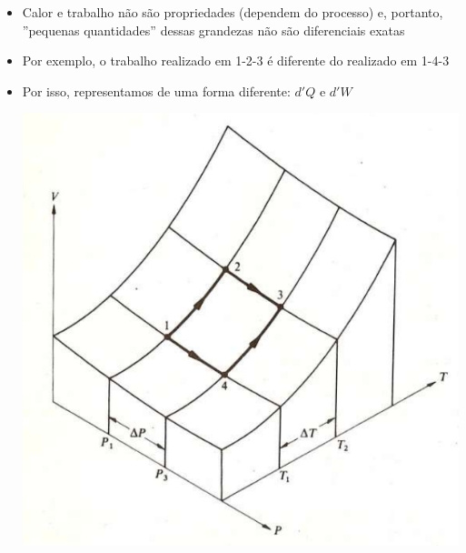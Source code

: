 \begin{frame}
    \begin{tcolorbox}[colback=red!10]
        \begin{itemize}
            \item Calor e trabalho não são propriedades (dependem do processo) e, portanto, ''pequenas quantidades''
                dessas grandezas não são diferenciais exatas
            \item Por exemplo, o trabalho realizado em 1-2-3 é diferente do realizado em 1-4-3
            \item Por isso, representamos de uma forma diferente: \(d'Q\) e \(d'W\)

                \centering
                \includegraphics[height=\textheight-88pt]{images/Captura de tela de 2023-04-26 08-27-55.png}
        \end{itemize}
    \end{tcolorbox}
\end{frame}

